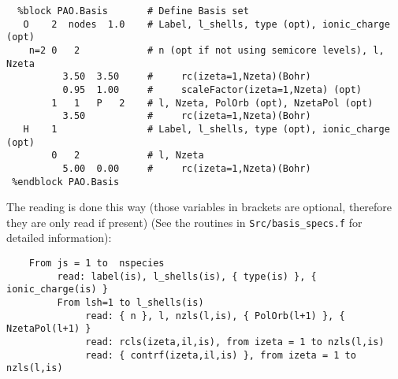 \documentclass[11pt]{article}
\begin{document}
\begin{description}
\begin{verbatim}
  %block PAO.Basis       # Define Basis set
   O    2  nodes  1.0    # Label, l_shells, type (opt), ionic_charge (opt)
    n=2 0   2            # n (opt if not using semicore levels), l, Nzeta
          3.50  3.50     #     rc(izeta=1,Nzeta)(Bohr)
          0.95  1.00     #     scaleFactor(izeta=1,Nzeta) (opt)
        1   1   P   2    # l, Nzeta, PolOrb (opt), NzetaPol (opt)
          3.50           #     rc(izeta=1,Nzeta)(Bohr)
   H    1                # Label, l_shells, type (opt), ionic_charge (opt)
        0   2            # l, Nzeta
          5.00  0.00     #     rc(izeta=1,Nzeta)(Bohr)
 %endblock PAO.Basis
\end{verbatim}

\noindent
The reading is done this way (those variables in brackets are
optional, therefore they are only read if present) (See 
the routines in {\tt Src/basis\_specs.f} for detailed information):

\begin{verbatim}
    From js = 1 to  nspecies 
         read: label(is), l_shells(is), { type(is) }, { ionic_charge(is) }
         From lsh=1 to l_shells(is)
              read: { n }, l, nzls(l,is), { PolOrb(l+1) }, { NzetaPol(l+1) }
              read: rcls(izeta,il,is), from izeta = 1 to nzls(l,is)
              read: { contrf(izeta,il,is) }, from izeta = 1 to nzls(l,is)
\end{verbatim}


\end{description}
\end{document}
